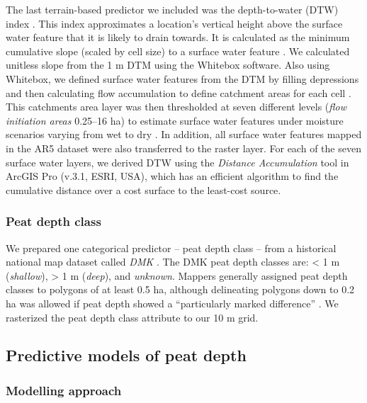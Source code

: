 \documentclass[soil, manuscript]{copernicus}
\begin{document}
The last terrain-based predictor we included was the depth-to-water (DTW) index \citep{murphyMappingWetlandsComparison2007}.
This index approximates a location's vertical height above the surface water feature that it is likely to drain towards.
It is calculated as the minimum cumulative slope (scaled by cell size) to a surface water feature \citep[eq. 5 in][]{murphyTopographicModellingSoil2009}.
We calculated unitless slope from the 1 m DTM using the Whitebox software.
Also using Whitebox, we defined surface water features from the DTM by filling depressions and then calculating flow accumulation to define catchment areas for each cell \citep{schonauerSpatiotemporalPredictionSoil2021, schonauerRcodeCalculatingDepthwater2021}.
This catchments area layer was then thresholded at seven different levels (\emph{flow initiation areas} 0.25--16 ha) to estimate surface water features under moisture scenarios varying from wet to dry \citep{murphyModellingMappingTopographic2011, agrenEvaluatingDigitalTerrain2014, schonauerSpatiotemporalPredictionSoil2021}.
In addition, all surface water features mapped in the AR5 dataset were also transferred to the raster layer.
For each of the seven surface water layers, we derived DTW using the \emph{Distance Accumulation} tool in ArcGIS Pro (v.3.1, ESRI, USA), which has an efficient algorithm to find the cumulative distance over a cost surface to the least-cost source.

\subsubsection{Peat depth class}

We prepared one categorical predictor -- peat depth class -- from a historical national map dataset called \emph{DMK} \citep{ahlstromAR5Klassifikasjonssystem2019}.
The DMK peat depth classes are: \textless{} 1 m (\emph{shallow}), \textgreater{} 1 m (\emph{deep}), and \emph{unknown}.
Mappers generally assigned peat depth classes to polygons of at least 0.5 ha, although delineating polygons down to 0.2 ha was allowed if peat depth showed a ``particularly marked difference'' \citep{bjordalMarkslagsklassifikasjonOkonomiskKartverk2007}.
We rasterized the peat depth class attribute to our 10 m grid.

\subsection{Predictive models of peat depth}

\subsubsection{Modelling approach}
\end{document}
